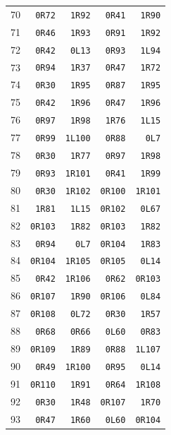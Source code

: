 \begin{longtable}{rrrrr}
70 & \texttt{0R72} & \texttt{1R92} & \texttt{0R41} & \texttt{1R90}\\
71 & \texttt{0R46} & \texttt{1R93} & \texttt{0R91} & \texttt{1R92}\\
72 & \texttt{0R42} & \texttt{0L13} & \texttt{0R93} & \texttt{1L94}\\
73 & \texttt{0R94} & \texttt{1R37} & \texttt{0R47} & \texttt{1R72}\\
74 & \texttt{0R30} & \texttt{1R95} & \texttt{0R87} & \texttt{1R95}\\
75 & \texttt{0R42} & \texttt{1R96} & \texttt{0R47} & \texttt{1R96}\\
76 & \texttt{0R97} & \texttt{1R98} & \texttt{1R76} & \texttt{1L15}\\
77 & \texttt{0R99} & \texttt{1L100} & \texttt{0R88} & \texttt{0L7}\\
78 & \texttt{0R30} & \texttt{1R77} & \texttt{0R97} & \texttt{1R98}\\
79 & \texttt{0R93} & \texttt{1R101} & \texttt{0R41} & \texttt{1R99}\\
80 & \texttt{0R30} & \texttt{1R102} & \texttt{0R100} & \texttt{1R101}\\
81 & \texttt{1R81} & \texttt{1L15} & \texttt{0R102} & \texttt{0L67}\\
82 & \texttt{0R103} & \texttt{1R82} & \texttt{0R103} & \texttt{1R82}\\
83 & \texttt{0R94} & \texttt{0L7} & \texttt{0R104} & \texttt{1R83}\\
84 & \texttt{0R104} & \texttt{1R105} & \texttt{0R105} & \texttt{0L14}\\
85 & \texttt{0R42} & \texttt{1R106} & \texttt{0R62} & \texttt{0R103}\\
86 & \texttt{0R107} & \texttt{1R90} & \texttt{0R106} & \texttt{0L84}\\
87 & \texttt{0R108} & \texttt{0L72} & \texttt{0R30} & \texttt{1R57}\\
88 & \texttt{0R68} & \texttt{0R66} & \texttt{0L60} & \texttt{0R83}\\
89 & \texttt{0R109} & \texttt{1R89} & \texttt{0R88} & \texttt{1L107}\\
90 & \texttt{0R49} & \texttt{1R100} & \texttt{0R95} & \texttt{0L14}\\
91 & \texttt{0R110} & \texttt{1R91} & \texttt{0R64} & \texttt{1R108}\\
92 & \texttt{0R30} & \texttt{1R48} & \texttt{0R107} & \texttt{1R70}\\
93 & \texttt{0R47} & \texttt{1R60} & \texttt{0L60} & \texttt{0R104}\\

\end{longtable}

